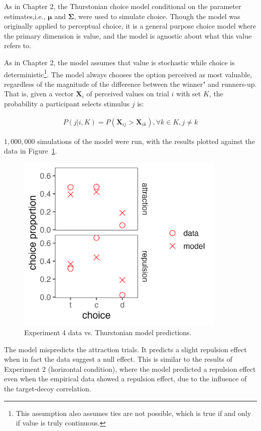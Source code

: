 As in Chapter 2, the Thurstonian choice model conditional on the parameter estimates,i.e., $\boldsymbol{\mu}$ and $\boldsymbol{\Sigma}$, were used to simulate choice. Though the model was originally applied to perceptual choice, it is a general purpose choice model where the primary dimension is value, and the model is agnostic about what this value refers to. 

As in Chapter 2, the model assumes that value is stochastic while choice is deterministic\footnote{This assumption also assumes ties are not possible, which is true if and only if value is truly continuous.}. The model always chooses the option perceived as most valuable, regardless of the magnitude of the difference between the winner" and runners-up. That is, given a vector $\mathbf{X}_i$ of perceived values on trial $i$ with set $K$, the probability a participant selects stimulus $j$ is:

\begin{align}
   P(j|i,K)=P(\mathbf{X}_{ij}>\mathbf{X}_{ik}), \forall k \in K, j \neq k
   \label{eqn:pchoice_price}
\end{align}

$1,000,000$ simulations of the model were run, with the results plotted against the data in Figure~\ref{fig:bayes_choice_sim_preds}.

\begin{figure}
    \includegraphics[scale=.5,width=100mm]{figures/bayes_choice_sim_preds.jpeg}
    \caption{Experiment 4 data vs. Thurstonian model predictions.}
    \label{fig:bayes_choice_sim_preds}
\end{figure}

The model mispredicts the attraction trials. It predicts a slight repulsion effect when in fact the data suggest a null effect. This is similar to the results of Experiment 2 (horizontal condition), where the model predicted a repulsion effect even when the empirical data showed a repulsion effect, due to the influence of the target-decoy correlation.

